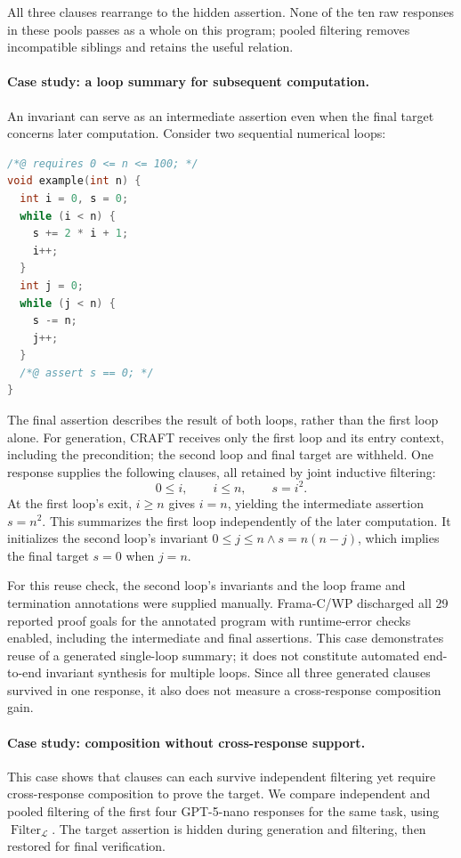 All three clauses rearrange to the hidden assertion.  None of the ten raw
responses in these pools passes as a whole on this program; pooled filtering
removes incompatible siblings and retains the useful relation.

\paragraph{Case study: a loop summary for subsequent computation.}
An invariant can serve as an intermediate assertion even when the final
target concerns later computation. Consider two sequential numerical loops:
\begin{lstlisting}[language=C]
/*@ requires 0 <= n <= 100; */
void example(int n) {
  int i = 0, s = 0;
  while (i < n) {
    s += 2 * i + 1;
    i++;
  }
  int j = 0;
  while (j < n) {
    s -= n;
    j++;
  }
  /*@ assert s == 0; */
}
\end{lstlisting}
The final assertion describes the result of both loops, rather than the
first loop alone. For generation, CRAFT receives only the first loop and its
entry context, including the precondition; the second loop and final target
are withheld. One response supplies the following clauses, all retained by
joint inductive filtering:
\[
  0\le i,\qquad i\le n,\qquad s=i^2.
\]
At the first loop's exit, \(i\ge n\) gives \(i=n\), yielding the intermediate
assertion \(s=n^2\). This summarizes the first loop independently of the
later computation. It initializes the second loop's invariant
\(0\le j\le n\land s=n(n-j)\), which implies the final target \(s=0\)
when \(j=n\).

For this reuse check, the second loop's invariants and the loop frame and
termination annotations were supplied manually. Frama-C/WP discharged all
29 reported proof goals for the annotated program with runtime-error checks
enabled, including the intermediate and final assertions. This case
demonstrates reuse of a generated single-loop summary; it does not constitute
automated end-to-end invariant synthesis for multiple loops. Since all three
generated clauses survived in one response, it also does not measure a
cross-response composition gain.

\paragraph{Case study: composition without cross-response support.}
This case shows that clauses can each survive independent filtering yet
require cross-response composition to prove the target. We compare independent
and pooled filtering of the first four GPT-5-nano responses for the same task,
using \(\operatorname{Filter}_{\mathcal L}\). The target assertion is hidden
during generation and filtering, then restored for final verification.

